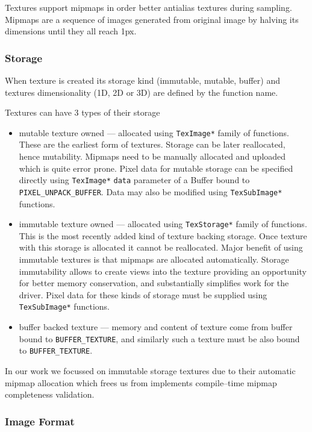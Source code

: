 Textures support mipmaps in order better antialias textures during sampling. Mipmaps are a sequence of images generated from original image by halving its dimensions until they all reach 1px.

\subsubsection{Storage}

When texture is created its storage kind (immutable, mutable, buffer) and textures dimensionality (1D, 2D or 3D) are defined by the function name.

Textures can have 3 types of their storage
\begin{itemize}
    \item mutable texture owned --- allocated using \texttt{TexImage*} family of functions. 
        These are the earliest form of textures. Storage can be later reallocated, hence mutability. 
        Mipmaps need to be manually allocated and uploaded which is quite error prone.
        Pixel data for mutable storage can be specified directly using 
        \texttt{TexImage*} \texttt{data} parameter of a Buffer bound to \texttt{PIXEL\_UNPACK\_BUFFER}.
        Data may also be modified using \texttt{TexSubImage*} functions.
    \item immutable texture owned --- allocated using \texttt{TexStorage*} family of functions. 
        This is the most recently added kind of texture backing storage. 
        Once texture with this storage is allocated it cannot be reallocated. 
        Major benefit of using immutable textures is that mipmaps are allocated automatically. 
        Storage immutability allows to create views into the texture providing 
        an opportunity for better memory conservation, and substantially simplifies work for the driver.
        Pixel data for these kinds of storage must be supplied using \texttt{TexSubImage*} functions.
    \item buffer backed texture --- memory and content of texture come from buffer bound to \texttt{BUFFER\_TEXTURE},
        and similarly such a texture must be also bound to \texttt{BUFFER\_TEXTURE}.
\end{itemize}

In our work we focussed on immutable storage textures due to their automatic mipmap allocation which frees us from 
implements compile--time mipmap completeness validation.

\subsubsection{Image Format}

